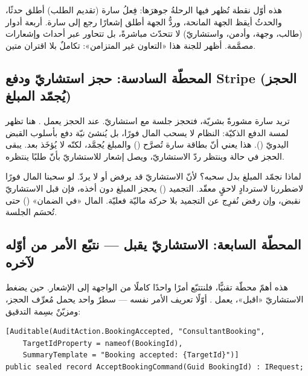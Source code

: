 \begin{spotlight}
هذه أوّل نقطة تُظهر فيها الرحلةُ جوهرَها: فِعلُ سارة (تقديم الطلب) أطلق حدثًا،
والحدثُ أيقظ الجهة المانحة، وردُّ الجهة أطلق إشعارًا رجع إلى سارة. أربعة أدوار
(طالب، وجهة، وأدمن، واستشاريّ) لا تتحدّث مباشرةً، بل تتحاور عبر أحداث وإشعارات
مصمَّمة. أظهر للجنة هذا «التعاون غير المتزامن»: تكاملٌ بلا اقتران متين.
\end{spotlight}

\subsection{المحطّة السادسة: حجز استشاريّ ودفع Stripe (الحجز يُجمّد المبلغ)}

تريد سارة مشورةً بشريّة، فتحجز جلسة مع استشاريّ. عند الحجز يعمل
. هنا تظهر لمسة الدفع الذكيّة: النظام لا يسحب المال فورًا،
بل يُنشئ نيّة دفع  بأسلوب القبض اليدويّ
(). هذا يعني أنّ بطاقة سارة تُصرَّح ()
والمبلغ يُجمَّد، لكنّه لا يُؤخَذ بعد. يبقى الحجز في حالة  وينتظر ردّ
الاستشاريّ، ويصل إشعار للاستشاريّ بأنّ طلبًا ينتظره.

\begin{why}
لماذا نجمّد المبلغ بدل سحبه؟ لأنّ الاستشاريّ قد يرفض أو لا يردّ. لو سحبنا المال
فورًا لاضطررنا لاستردادٍ لاحقٍ معقّد. التجميد () يحجز المبلغ دون أخذه،
فإن قبل الاستشاريّ نقبض، وإن رفض نُفرِج عن التجميد بلا حركة ماليّة فعليّة. المال
«في الضمان» () حتى تُحسَم الجلسة.
\end{why}

\subsection{المحطّة السابعة: الاستشاريّ يقبل — نتبّع الأمر من أوّله لآخره}

هذه أهمّ محطّة تقنيًّا، فلنتتبّع أمرًا واحدًا كاملًا من الواجهة إلى الإشعار. حين يضغط
الاستشاريّ «اقبل»، يعمل . أوّلًا تعريف الأمر نفسه — سطرٌ
واحد يحمل مُعرِّف الحجز، ومزيّنٌ بسِمة التدقيق:

\begin{english}
\begin{lstlisting}[language={[Sharp]C}]
[Auditable(AuditAction.BookingAccepted, "ConsultantBooking",
    TargetIdProperty = nameof(BookingId),
    SummaryTemplate = "Booking accepted: {TargetId}")]
public sealed record AcceptBookingCommand(Guid BookingId) : IRequest;
\end{lstlisting}
\end{english}

